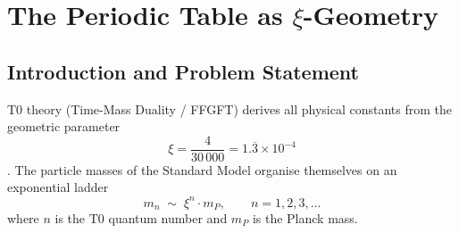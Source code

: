 
\chapter{The Periodic Table as \texorpdfstring{$\xi$}{xi}-Geometry}
\label{chap:periodic-xi}

\begin{abstract}
The periodic table of the elements and the particle-mass ladder of T0 theory
share the same geometric quantum number~$n$, but in different roles.
Particle masses follow a \emph{radial} exponential scaling
$m_n \sim \xi^{n} \cdot m_P$, while the shell structure of the periodic table
obeys an \emph{angular} quadratic degeneracy $g_n = 2n^2$.
Both arise from the three-dimensional lattice geometry of T0 theory:
$\xi$ is the packing deficit of the 3D lattice (radial direction),
$2n^2$ is the degeneracy of the $n$-th spherical shell in the same lattice
(angular direction).
The Rydberg energy lies exactly on rung~7 of the $\xi$-power ladder:
$R_\infty = \frac{m_e \alpha^2}{2} \approx \xi^{6.956} \cdot E_P$.
The duality principle $E_n \cdot g_n = 2R_\infty = \text{const}$
connects the $1/n^2$ energy ladder with the $n^2$ filling ladder
and is a geometric equipartition.
The periodic table is the angular cross-section of the $\xi$-geometry at
rung $\xi^{\sim 7}$ — analogously, the lepton masses are the radial cross-section
at rungs $\xi^{4.9}$–$\xi^{5.8}$.
\end{abstract}

\section{Introduction and Problem Statement}
\label{sec:intro}

T0 theory (Time-Mass Duality / FFGFT) derives all physical constants from the
geometric parameter
\begin{equation}
  \xi = \frac{4}{30\,000} = 1.\overline{3} \times 10^{-4}
\end{equation}
\cite{dok009,dok041,dok056}.
The particle masses of the Standard Model organise themselves on an exponential
ladder
\begin{equation}
  m_n \;\sim\; \xi^{n} \cdot m_P, \qquad n = 1, 2, 3, \ldots
  \label{eq:massldr}
\end{equation}
where $n$ is the T0 quantum number and $m_P$ is the Planck mass.

